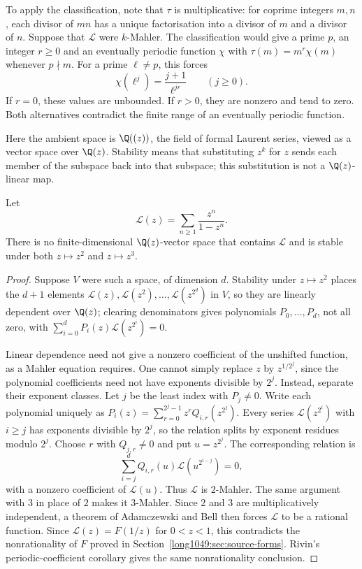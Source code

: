 To apply the classification, note that $\tau$ is multiplicative:
for coprime integers $m,n$, each divisor of $mn$ has a unique
factorisation into a divisor of $m$ and a divisor of $n$.
Suppose that $\mathcal L$ were $k$-Mahler. The classification would give a prime $p$, an integer
$r\ge0$ and an eventually periodic function $\chi$ with
$\tau(m)=m^r\chi(m)$ whenever $p\nmid m$. For a prime $\ell\ne p$,
this forces
\[
 \chi(\ell^j)=\frac{j+1}{\ell^{jr}}\qquad(j\ge0).
\]
If $r=0$, these values are unbounded. If $r>0$, they are nonzero
and tend to zero. Both alternatives contradict the finite range of
an eventually periodic function.


Here the ambient space is $\Q((z))$, the field of formal Laurent
series, viewed as a vector space over $\Q(z)$. Stability means that
substituting $z^k$ for $z$ sends each member of the subspace back into
that subspace; this substitution is not a $\Q(z)$-linear map.

\begin{proposition}\label{long1049:res:nomahler}
Let
\[
 \mathcal L(z)=\sum_{n\ge1}\frac{z^n}{1-z^n}.
\]
There is no finite-dimensional $\Q(z)$-vector space that contains $\mathcal L$
and is stable under both $z\mapsto z^2$ and $z\mapsto z^3$.
\end{proposition}

\begin{proof}
Suppose $V$ were such a space, of dimension $d$.  Stability under $z\mapsto z^2$
places the $d+1$ elements $\mathcal L(z),\mathcal L(z^2),\dots,\mathcal
L(z^{2^{d}})$ in $V$, so they are linearly dependent over $\Q(z)$; clearing
denominators gives polynomials $P_0,\dots,P_d$, not all zero, with
$\sum_{i=0}^{d}P_i(z)\mathcal L(z^{2^i})=0$.

Linear dependence need not give a nonzero coefficient of the
unshifted function, as a Mahler equation requires. One cannot simply
replace $z$ by $z^{1/2^j}$, since the polynomial coefficients need
not have exponents divisible by $2^j$. Instead, separate their
exponent classes. Let $j$ be the least index with $P_j\ne0$. Write each polynomial uniquely as
$P_i(z)=\sum_{r=0}^{2^j-1}z^rQ_{i,r}(z^{2^j})$.
Every series $\mathcal L(z^{2^i})$ with $i\ge j$ has exponents
divisible by $2^j$, so the relation splits by exponent residues modulo
$2^j$. Choose $r$ with $Q_{j,r}\ne0$ and put $u=z^{2^j}$. The
corresponding relation is
\[
 \sum_{i=j}^{d}Q_{i,r}(u)\mathcal L(u^{2^{i-j}})=0,
\]
with a nonzero coefficient of $\mathcal L(u)$. Thus $\mathcal L$ is
$2$-Mahler. The same argument with $3$ in place of $2$ makes it
$3$-Mahler. Since $2$ and
$3$ are multiplicatively independent, a theorem of Adamczewski and Bell
\cite[Thm.~1.1, p.~6]{adamczewskibell2013} then forces $\mathcal L$ to be a rational
function. Since $\mathcal L(z)=F(1/z)$ for $0<z<1$, this contradicts
the nonrationality of $F$ proved in Section~\ref{long1049:sec:source-forms}.
Rivin's periodic-coefficient corollary
\cite[Cor.~6.4, p.~9]{rivin2026} gives the same nonrationality conclusion.
\end{proof}

